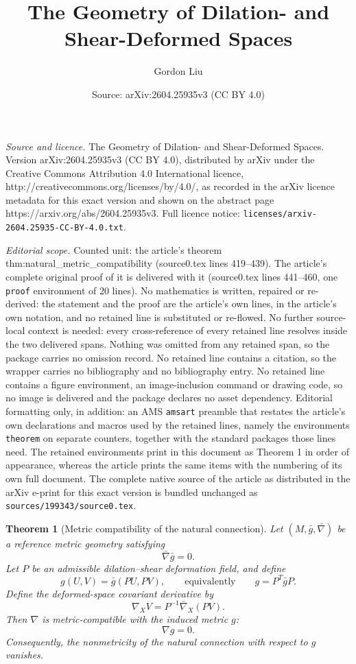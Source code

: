 \documentclass[10pt,a4paper]{amsart}
\title{The Geometry of Dilation- and Shear-Deformed Spaces}
\author{Gordon Liu}
\date{Source: arXiv:2604.25935v3 (CC BY 4.0)}
\newtheorem{theorem}{Theorem}
\begin{document}
\maketitle

\noindent\emph{Source and licence.} The Geometry of Dilation- and Shear-Deformed Spaces. Version arXiv:2604.25935v3 (CC BY 4.0), distributed by arXiv under the Creative Commons Attribution 4.0 International licence, http://creativecommons.org/licenses/by/4.0/, as recorded in the arXiv licence metadata for this exact version and shown on the abstract page https://arxiv.org/abs/2604.25935v3. Full licence notice: \texttt{licenses/arxiv-2604.25935-CC-BY-4.0.txt}.\par\smallskip

\noindent\textit{Editorial scope.} Counted unit: the article's theorem thm:natural\_metric\_compatibility (source0.tex lines 419--439). The article's complete original proof of it is delivered with it (source0.tex lines 441--460, one \texttt{proof} environment of 20 lines). No mathematics is written, repaired or re-derived: the statement and the proof are the article's own lines, in the article's own notation, and no retained line is substituted or re-flowed.  No further source-local context is needed: every cross-reference of every retained line resolves inside the two delivered spans.  Nothing was omitted from any retained span, so the package carries no omission record.  No retained line contains a citation, so the wrapper carries no bibliography and no bibliography entry.  No retained line contains a figure environment, an image-inclusion command or drawing code, so no image is delivered and the package declares no asset dependency.  Editorial formatting only, in addition: an AMS \texttt{amsart} preamble that restates the article's own declarations and macros used by the retained lines, namely the environments \texttt{theorem} on separate counters, together with the standard packages those lines need.  The retained environments print in this document as Theorem 1 in order of appearance, whereas the article prints the same items with the numbering of its own full document.  The complete native source of the article as distributed in the arXiv e-print for this exact version is bundled unchanged as \texttt{sources/199343/source0.tex}.
\begin{theorem}[Metric compatibility of the natural connection]\label{thm:natural_metric_compatibility}
Let \((M,\bar g,\bar\nabla)\) be a reference metric geometry satisfying
\[
 \bar\nabla\bar g=0.
\]
Let \(P\) be an admissible dilation--shear deformation field, and define
\[
 g(U,V)=\bar g(PU,PV),
 \qquad\text{equivalently}\qquad
 g=P^T\bar gP.
\]
Define the deformed-space covariant derivative by
\[
 \nabla_XV=P^{-1}\bar\nabla_X(PV).
\]
Then \(\nabla\) is metric-compatible with the induced metric \(g\):
\[
 \nabla g=0.
\]
Consequently, the nonmetricity of the natural connection with respect to \(g\) vanishes.
\end{theorem}
\end{document}
